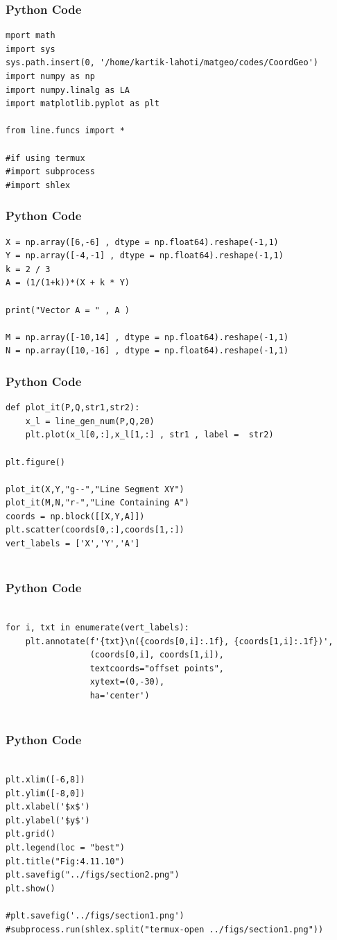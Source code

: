 \documentclass{beamer}
\begin{document}
\begin{frame}[fragile]
    \frametitle{Python Code}
    \begin{lstlisting}
mport math
import sys 
sys.path.insert(0, '/home/kartik-lahoti/matgeo/codes/CoordGeo')
import numpy as np
import numpy.linalg as LA
import matplotlib.pyplot as plt

from line.funcs import *

#if using termux
#import subprocess
#import shlex
\end{lstlisting}
\end{frame}

\begin{frame}[fragile]
    \frametitle{Python Code }
    \begin{lstlisting}
X = np.array([6,-6] , dtype = np.float64).reshape(-1,1)
Y = np.array([-4,-1] , dtype = np.float64).reshape(-1,1)
k = 2 / 3
A = (1/(1+k))*(X + k * Y)
 
print("Vector A = " , A ) 

M = np.array([-10,14] , dtype = np.float64).reshape(-1,1)
N = np.array([10,-16] , dtype = np.float64).reshape(-1,1)
\end{lstlisting}
\end{frame}

\begin{frame}[fragile]
    \frametitle{Python Code }
    \begin{lstlisting}
def plot_it(P,Q,str1,str2):
    x_l = line_gen_num(P,Q,20)
    plt.plot(x_l[0,:],x_l[1,:] , str1 , label =  str2)

plt.figure()

plot_it(X,Y,"g--","Line Segment XY")
plot_it(M,N,"r-","Line Containing A")
coords = np.block([[X,Y,A]])
plt.scatter(coords[0,:],coords[1,:])
vert_labels = ['X','Y','A']


\end{lstlisting}
\end{frame}

\begin{frame}[fragile]
    \frametitle{Python Code }
    \begin{lstlisting}

for i, txt in enumerate(vert_labels):
    plt.annotate(f'{txt}\n({coords[0,i]:.1f}, {coords[1,i]:.1f})',
                 (coords[0,i], coords[1,i]),
                 textcoords="offset points",
                 xytext=(0,-30),
                 ha='center')
                 
    \end{lstlisting}
\end{frame}
\begin{frame}[fragile]
    \frametitle{Python Code }
    \begin{lstlisting}
    
plt.xlim([-6,8])
plt.ylim([-8,0])
plt.xlabel('$x$')
plt.ylabel('$y$')
plt.grid()
plt.legend(loc = "best")
plt.title("Fig:4.11.10")
plt.savefig("../figs/section2.png")
plt.show()

#plt.savefig('../figs/section1.png')
#subprocess.run(shlex.split("termux-open ../figs/section1.png"))

    \end{lstlisting}
\end{frame}
\end{document}
